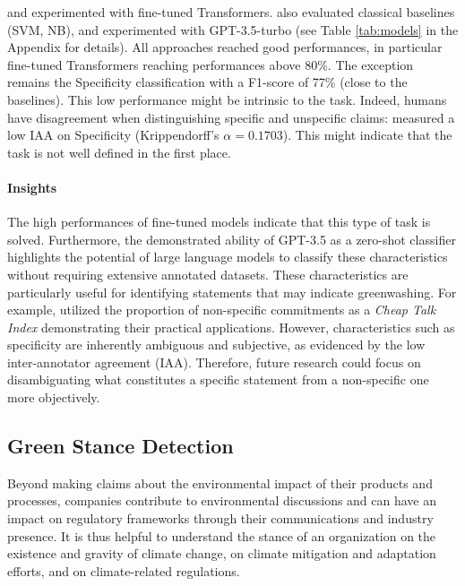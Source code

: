 \solutions \citet{vinicius_woloszyn_towards_2021, tobias_schimanski_climatebert-netzero_2023} and \citet{bingler2023cheaptalkspecificitysentiment} experimented with fine-tuned Transformers. \citet{bingler2023cheaptalkspecificitysentiment} also evaluated classical baselines (SVM, NB), and \citet{tobias_schimanski_climatebert-netzero_2023} experimented with GPT-3.5-turbo (see Table \ref{tab:models} in the Appendix for details). All approaches reached good performances, in particular fine-tuned Transformers reaching performances above 80\%. The exception remains the Specificity classification with a F1-score of 77\% (close to the baselines). This low performance  might be intrinsic to the task. Indeed, humans have disagreement when distinguishing specific and unspecific claims: 
\citet{bingler2023cheaptalkspecificitysentiment} measured a low IAA on Specificity (Krippendorff's $\alpha=0.1703$). This might indicate that the task is not well defined in the first place. 

\paragraph{Insights} 
The high performances of fine-tuned models indicate that this type of task is solved. Furthermore, the demonstrated ability of GPT-3.5 as a zero-shot classifier \cite{tobias_schimanski_climatebert-netzero_2023} highlights the potential of large language models to classify these characteristics without requiring extensive annotated datasets. 
These characteristics are particularly useful for identifying statements that may indicate greenwashing. For example, \citet{bingler2023cheaptalkspecificitysentiment} utilized the proportion of non-specific commitments as a \textit{Cheap Talk Index} demonstrating their practical applications.
However, characteristics such as specificity are inherently ambiguous and subjective, as evidenced by the low inter-annotator agreement (IAA). Therefore, future research could focus on disambiguating what constitutes a specific statement from a non-specific one more objectively.  

\subsection{Green Stance Detection}
\label{sec:stance detection}

Beyond making claims about the environmental impact of their products and processes, companies contribute to environmental discussions and can have an impact on regulatory frameworks through their communications and industry presence. It is thus helpful to understand the stance of an organization on the existence and gravity of climate change, on climate mitigation and adaptation efforts, and on climate-related regulations. 

